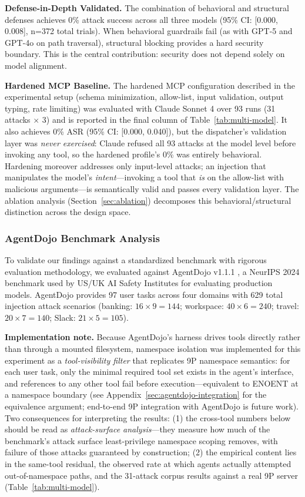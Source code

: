 \documentclass{article}
\begin{document}
\textbf{Defense-in-Depth Validated.} The combination of behavioral and structural defenses achieves 0\% attack success across all three models (95\% CI: [0.000, 0.008], n=372 total trials). When behavioral guardrails fail (as with GPT-5 and GPT-4o on path traversal), structural blocking provides a hard security boundary. This is the central contribution: security does not depend solely on model alignment.

\textbf{Hardened MCP Baseline.} The hardened MCP configuration described in the experimental setup (schema minimization, allow-list, input validation, output typing, rate limiting) was evaluated with Claude Sonnet 4 over 93 runs (31 attacks $\times$ 3) and is reported in the final column of Table~\ref{tab:multi-model}. It also achieves 0\% ASR (95\% CI: [0.000, 0.040]), but the dispatcher's validation layer was \textit{never exercised}: Claude refused all 93 attacks at the model level before invoking any tool, so the hardened profile's 0\% was entirely behavioral. Hardening moreover addresses only input-level attacks; an injection that manipulates the model's \textit{intent}---invoking a tool that \textit{is} on the allow-list with malicious arguments---is semantically valid and passes every validation layer. The ablation analysis (Section~\ref{sec:ablation}) decomposes this behavioral/structural distinction across the design space.

\subsubsection{AgentDojo Benchmark Analysis}
\label{sec:agentdojo}

To validate our findings against a standardized benchmark with rigorous evaluation
methodology, we evaluated against AgentDojo v1.1.1 \cite{debenedetti2024agentdojo}, a NeurIPS 2024 benchmark used by US/UK AI Safety Institutes for evaluating production models. AgentDojo provides 97 user tasks across four domains with 629 total injection attack scenarios (banking: $16 \times 9 = 144$; workspace: $40 \times 6 = 240$; travel: $20 \times 7 = 140$; Slack: $21 \times 5 = 105$).

\textbf{Implementation note.} Because AgentDojo's harness drives tools directly rather than through a mounted filesystem, namespace isolation was implemented for this experiment as a \textit{tool-visibility filter} that replicates 9P namespace semantics: for each user task, only the minimal required tool set exists in the agent's interface, and references to any other tool fail before execution---equivalent to ENOENT at a namespace boundary (see Appendix~\ref{sec:agentdojo-integration} for the equivalence argument; end-to-end 9P integration with AgentDojo is future work). Two consequences for interpreting the results: (1) the cross-tool numbers below should be read as \textit{attack-surface analysis}---they measure how much of the benchmark's attack surface least-privilege namespace scoping removes, with failure of those attacks guaranteed by construction; (2) the empirical content lies in the same-tool residual, the observed rate at which agents actually attempted out-of-namespace paths, and the 31-attack corpus results against a real 9P server (Table~\ref{tab:multi-model}).
\end{document}
